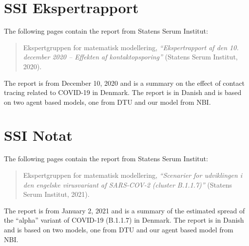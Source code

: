 
\chapter{SSI Ekspertrapport}
\label{appendix:ssi-report}

The following  pages contain the report from Statens Serum Institut:
\begin{quote}
    Ekspertgruppen for matematisk modellering, \emph{``Ekspertrapport af den 10. december 2020 -- Effekten af kontaktopsporing''} (Statens Serum Institut, 2020).
\end{quote}
The report is from December 10, 2020 and is a summary on the effect of contact tracing related to COVID-19 in Denmark. The report is in Danish and is based on two agent based models, one from DTU and our model from NBI.

\clearpage
% 




\chapter{SSI Notat}
\label{appendix:ssi-notat}

The following  pages contain the report from Statens Serum Institut:
\begin{quote}
    Ekspertgruppen for matematisk modellering, \emph{``Scenarier for udviklingen i den engelske virusvariant af SARS-COV-2 (cluster B.1.1.7)''} (Statens Serum Institut, 2021).
\end{quote}
The report is from January 2, 2021 and is a summary of the estimated spread of the ``alpha'' variant of COVID-19 (B.1.1.7) in Denmark. The report is in Danish and is based on two models, one from DTU and our agent based model from NBI.

\clearpage

